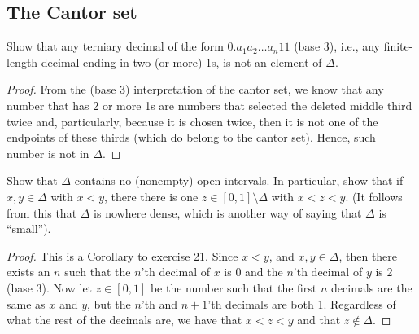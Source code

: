 \subsection{The Cantor set}


\begin{exercise}{21}
Show that any terniary decimal of the form $0.a_1a_2\dots a_n11$ (base 3), i.e., any finite-length decimal ending in two (or more) 1s, is not an element of $\Delta$.
\end{exercise}
\begin{proof}
From the (base 3) interpretation of the cantor set, we know that any number that has 2 or more 1s are numbers that selected the deleted middle third twice and, particularly, because it is chosen twice, then it is not one of the endpoints of these thirds (which do belong to the cantor set). Hence, such number is not in $\Delta$.
\end{proof} 

\begin{exercise}{22}
Show that $\Delta$ contains no (nonempty) open intervals. In particular, show that if $x,y\in\Delta$ with $x<y$, there there is one $z\in[0,1]\setminus\Delta$ with $x<z<y$. (It follows from this that $\Delta$ is nowhere dense, which is another way of saying that $\Delta$ is ``small'').
\end{exercise}
\begin{proof}
This is a Corollary to exercise 21. Since $x<y$, and $x,y\in\Delta$, then there exists an $n$ such that the $n$'th decimal of $x$ is 0 and the $n$'th decimal of $y$ is 2 (base 3). Now let $z\in[0,1]$ be the number such that the first $n$ decimals are the same as $x$ and $y$, but the $n$'th and $n+1$'th decimals are both 1. Regardless of what the rest of the decimals are, we have that $x<z<y$ and that $z\notin\Delta$.
\end{proof} 

